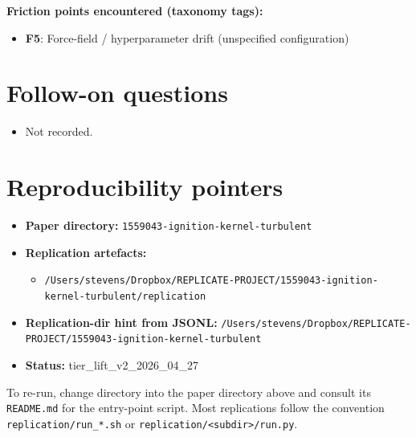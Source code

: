 \documentclass[11pt]{article}
\begin{document}
\noindent\textbf{Friction points encountered (taxonomy tags):}
\begin{itemize}
\item \textbf{F5}: Force-field / hyperparameter drift (unspecified configuration)
\end{itemize}

\section{Follow-on questions}
\begin{itemize}
\item Not recorded.
\end{itemize}

\section{Reproducibility pointers}\label{sec:repro}
\begin{itemize}
\item \textbf{Paper directory:} \texttt{1559043-ignition-kernel-turbulent}
\item \textbf{Replication artefacts:}
\begin{itemize}
\item \texttt{/Users/stevens/Dropbox/REPLICATE-PROJECT/1559043-ignition-kernel-turbulent/replication}
\end{itemize}
\item \textbf{Replication-dir hint from JSONL:} \texttt{/Users/stevens/Dropbox/REPLICATE-PROJECT/1559043-ignition-kernel-turbulent}
\item \textbf{Status:} tier\_lift\_v2\_2026\_04\_27
\end{itemize}

To re-run, change directory into the paper directory above and consult its \texttt{README.md} for the entry-point script. Most replications follow the convention \texttt{replication/run\_*.sh} or \texttt{replication/<subdir>/run.py}.
\end{document}
